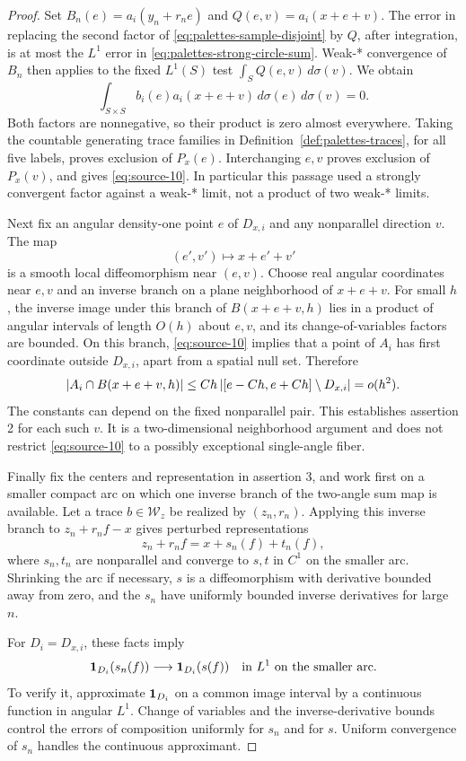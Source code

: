 \begin{proof}
Set \(B_n(e)=a_i(y_n+r_ne)\) and
\(Q(e,v)=a_i(x+e+v)\).  The error in replacing the second factor
of \eqref{eq:palettes-sample-disjoint} by \(Q\), after integration,
is at most the \(L^1\) error in
\eqref{eq:palettes-strong-circle-sum}.  Weak-* convergence of \(B_n\)
then applies to the fixed \(L^1(S)\) test
\(\int_S Q(e,v)\,d\sigma(v)\).  We obtain
\[
 \int_{S\times S}b_i(e)a_i(x+e+v)\,d\sigma(e)\,d\sigma(v)=0.
\]
Both factors are nonnegative, so their product is zero almost
everywhere.  Taking the countable generating trace families in
Definition~\ref{def:palettes-traces}, for all five labels, proves
exclusion of \(P_x(e)\).  Interchanging \(e,v\) proves exclusion
of \(P_x(v)\), and gives \eqref{eq:source-10}.
In particular this passage used a strongly convergent factor
against a weak-* limit, not a product of two weak-* limits.

Next fix an angular density-one point \(e\) of \(D_{x,i}\) and
any nonparallel direction \(v\).  The map
\[
 (e',v')\longmapsto x+e'+v'
\]
is a smooth local diffeomorphism near \((e,v)\).
Choose real angular coordinates near \(e,v\) and an inverse branch
on a plane neighborhood of \(x+e+v\).
For small \(h\), the inverse image under this branch of
\(B(x+e+v,h)\) lies in a product of angular intervals of length
\(O(h)\) about \(e,v\), and its change-of-variables factors are
bounded.  On this branch, \eqref{eq:source-10} implies that a
point of \(A_i\) has first coordinate outside \(D_{x,i}\), apart
from a spatial null set.  Therefore
\[
 \lvert A_i\cap B(x+e+v,h)\rvert
 \le C h\,
       \lvert[e-Ch,e+Ch]\setminus D_{x,i}\rvert
 =o(h^2).
\]
The constants can depend on the fixed nonparallel pair.  This
establishes assertion 2 for each such \(v\).  It is a
two-dimensional neighborhood argument and does not restrict
\eqref{eq:source-10} to a possibly exceptional single-angle fiber.

Finally fix the centers and representation in assertion 3, and work
first on a smaller compact arc on which one inverse branch of the
two-angle sum map is available.  Let a trace \(b\in\mathcal W_z\)
be realized by \((z_n,r_n)\).  Applying this inverse branch to
\(z_n+r_nf-x\) gives perturbed representations
\[
 z_n+r_nf=x+s_n(f)+t_n(f),
\]
where \(s_n,t_n\) are nonparallel and converge to \(s,t\) in \(C^1\)
on the smaller arc.  Shrinking the arc if necessary, \(s\) is
a diffeomorphism with derivative bounded away from zero, and the
\(s_n\) have uniformly bounded inverse derivatives for large \(n\).

For \(D_i=D_{x,i}\), these facts imply
\begin{equation}\label{eq:palettes-pullback-continuity}
 \mathbf 1_{D_i}(s_n(f))\longrightarrow\mathbf 1_{D_i}(s(f))
 \quad\text{in }L^1\text{ on the smaller arc}.
\end{equation}
To verify it, approximate \(\mathbf 1_{D_i}\) on a common image interval
by a continuous function in angular \(L^1\).  Change of variables
and the inverse-derivative bounds control the errors of composition
uniformly for \(s_n\) and for \(s\).  Uniform convergence of \(s_n\)
handles the continuous approximant.


\end{proof}
